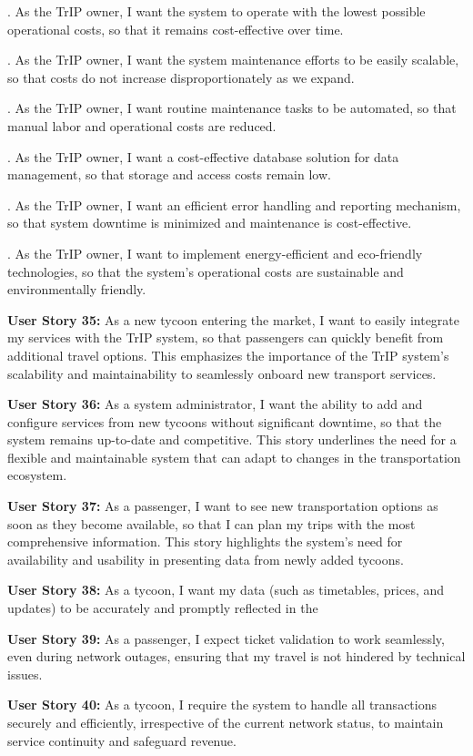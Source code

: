 . As the TrIP owner, I want the system to operate with the lowest possible operational costs, so that it remains cost-effective over time.

. As the TrIP owner, I want the system maintenance efforts to be easily scalable, so that costs do not increase disproportionately as we expand.

. As the TrIP owner, I want routine maintenance tasks to be automated, so that manual labor and operational costs are reduced.

. As the TrIP owner, I want a cost-effective database solution for data management, so that storage and access costs remain low.

. As the TrIP owner, I want an efficient error handling and reporting mechanism, so that system downtime is minimized and maintenance is cost-effective.

. As the TrIP owner, I want to implement energy-efficient and eco-friendly technologies, so that the system's operational costs are sustainable and environmentally friendly.

\textbf{User Story 35:} As a new tycoon entering the market, I want to easily integrate my services with the TrIP system, so that passengers can quickly benefit from additional travel options. This emphasizes the importance of the TrIP system's scalability and maintainability to seamlessly onboard new transport services.

\textbf{User Story 36:} As a system administrator, I want the ability to add and configure services from new tycoons without significant downtime, so that the system remains up-to-date and competitive. This story underlines the need for a flexible and maintainable system that can adapt to changes in the transportation ecosystem.

\textbf{User Story 37:} As a passenger, I want to see new transportation options as soon as they become available, so that I can plan my trips with the most comprehensive information. This story highlights the system's need for availability and usability in presenting data from newly added tycoons.

\textbf{User Story 38:} As a tycoon, I want my data (such as timetables, prices, and updates) to be accurately and promptly reflected in the

\item \textbf{User Story 39:} As a passenger, I expect ticket validation to work seamlessly, even during network outages, ensuring that my travel is not hindered by technical issues. 

\item \textbf{User Story 40:} As a tycoon, I require the system to handle all transactions securely and efficiently, irrespective of the current network status, to maintain service continuity and safeguard revenue. 
